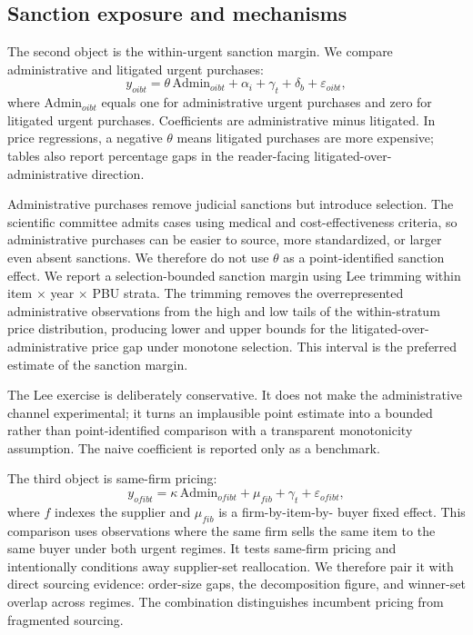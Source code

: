 \subsection{Sanction exposure and mechanisms}
\label{subsec:utg}

The second object is the within-urgent sanction margin. We compare
administrative and litigated urgent purchases:
\begin{equation}
y_{oibt}=\theta\,\text{Admin}_{oibt}+\alpha_i+\gamma_t+\delta_b+\varepsilon_{oibt},
\label{eq:utg}
\end{equation}
where $\text{Admin}_{oibt}$ equals one for administrative urgent
purchases and zero for litigated urgent purchases. Coefficients are
administrative minus litigated. In price regressions, a negative
$\theta$ means litigated purchases are more expensive; tables also
report percentage gaps in the reader-facing litigated-over-
administrative direction.

Administrative purchases remove judicial sanctions but introduce
selection. The scientific committee admits cases using medical and
cost-effectiveness criteria, so administrative purchases can be
easier to source, more standardized, or larger even absent sanctions.
We therefore do not use $\theta$ as a point-identified sanction
effect. We report a selection-bounded sanction margin using Lee
trimming \citep{lee2009training} within
item $\times$ year $\times$ PBU strata. The trimming removes the overrepresented
administrative observations from the high and low tails of the
within-stratum price distribution, producing lower and upper bounds
for the litigated-over-administrative price gap under monotone
selection. This interval is the preferred estimate of the sanction
margin.

The Lee exercise is deliberately conservative. It does not make the
administrative channel experimental; it turns an implausible point
estimate into a bounded rather than point-identified comparison with a
transparent monotonicity assumption. The naive coefficient is reported
only as a benchmark.

The third object is same-firm pricing:
\begin{equation}
y_{ofibt}=\kappa\,\text{Admin}_{ofibt}+\mu_{fib}+\gamma_t+\varepsilon_{ofibt},
\label{eq:triple}
\end{equation}
where $f$ indexes the supplier and $\mu_{fib}$ is a firm-by-item-by-
buyer fixed effect. This comparison uses observations where the same
firm sells the same item to the same buyer under both urgent regimes.
It tests same-firm pricing and intentionally conditions away
supplier-set reallocation. We therefore pair it with direct sourcing
evidence: order-size gaps, the decomposition figure, and winner-set
overlap across regimes. The combination distinguishes incumbent
pricing from fragmented sourcing.

